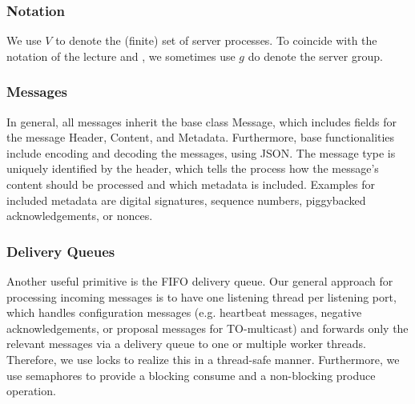 \documentclass[runningheads]{llncs}
\begin{document}
\subsubsection{Notation} We use $V$ to denote the (finite) set of server processes. To coincide with the notation of the lecture and \cite{ds_book}, we sometimes use $g$ do denote the server group.

\subsubsection{Messages}
In general, all messages inherit the base class \textsf{Message}, which includes fields for the message \textsf{Header}, \textsf{Content}, and \textsf{Metadata}. Furthermore, base functionalities include encoding and decoding the messages, using JSON. The message type is uniquely identified by the header, which tells the process how the message's content should be processed and which metadata is included. Examples for included metadata are digital signatures, sequence numbers, piggybacked acknowledgements, or nonces.

\subsubsection{Delivery Queues}
Another useful primitive is the FIFO delivery queue. Our general approach for processing incoming messages is to have one listening thread per listening port, which handles configuration messages (e.g. heartbeat messages, negative acknowledgements, or proposal messages for TO-multicast) and forwards only the relevant messages via a delivery queue to one or multiple worker threads. Therefore, we use locks to realize this in a thread-safe manner. Furthermore, we use semaphores to provide a blocking consume and a non-blocking produce operation. 
\end{document}

